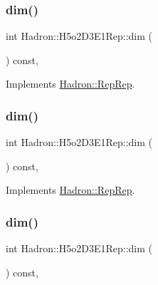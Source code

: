 \subsubsection{\texorpdfstring{dim()}{dim()}\hspace{0.1cm}{\footnotesize\ttfamily [3/5]}}
{\footnotesize\ttfamily int Hadron\+::\+H5o2\+D3\+E1\+Rep\+::dim (\begin{DoxyParamCaption}{ }\end{DoxyParamCaption}) const\hspace{0.3cm}{\ttfamily [inline]}, {\ttfamily [virtual]}}



Implements \mbox{\hyperlink{structHadron_1_1RepRep_a92c8802e5ed7afd7da43ccfd5b7cd92b}{Hadron\+::\+Rep\+Rep}}.

\mbox{\label{structHadron_1_1H5o2D3E1Rep_a8d8d89d8cfd44d7ac0dc6357bdedd487}} 
\subsubsection{\texorpdfstring{dim()}{dim()}\hspace{0.1cm}{\footnotesize\ttfamily [4/5]}}
{\footnotesize\ttfamily int Hadron\+::\+H5o2\+D3\+E1\+Rep\+::dim (\begin{DoxyParamCaption}{ }\end{DoxyParamCaption}) const\hspace{0.3cm}{\ttfamily [inline]}, {\ttfamily [virtual]}}



Implements \mbox{\hyperlink{structHadron_1_1RepRep_a92c8802e5ed7afd7da43ccfd5b7cd92b}{Hadron\+::\+Rep\+Rep}}.

\mbox{\label{structHadron_1_1H5o2D3E1Rep_a8d8d89d8cfd44d7ac0dc6357bdedd487}} 
\subsubsection{\texorpdfstring{dim()}{dim()}\hspace{0.1cm}{\footnotesize\ttfamily [5/5]}}
{\footnotesize\ttfamily int Hadron\+::\+H5o2\+D3\+E1\+Rep\+::dim (\begin{DoxyParamCaption}{ }\end{DoxyParamCaption}) const\hspace{0.3cm}{\ttfamily [inline]}, {\ttfamily [virtual]}}



